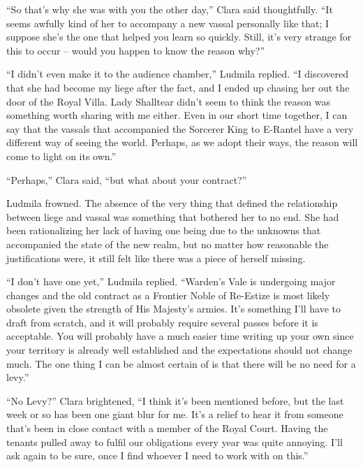  

“So that’s why she was with you the other day,” Clara said thoughtfully. “It seems awfully kind of her to accompany a new vassal personally like that; I suppose she’s the one that helped you learn so quickly. Still, it’s very strange for this to occur – would you happen to know the reason why?”

 

“I didn’t even make it to the audience chamber,” Ludmila replied. “I discovered that she had become my liege after the fact, and I ended up chasing her out the door of the Royal Villa. Lady Shalltear didn’t seem to think the reason was something worth sharing with me either. Even in our short time together, I can say that the vassals that accompanied the Sorcerer King to E-Rantel have a very different way of seeing the world. Perhaps, as we adopt their ways, the reason will come to light on its own.”

 

“Perhaps,” Clara said, “but what about your contract?”

 

Ludmila frowned. The absence of the very thing that defined the relationship between liege and vassal was something that bothered her to no end. She had been rationalizing her lack of having one being due to the unknowns that accompanied the state of the new realm, but no matter how reasonable the justifications were, it still felt like there was a piece of herself missing.

 

“I don’t have one yet,” Ludmila replied. “Warden’s Vale is undergoing major changes and the old contract as a Frontier Noble of Re-Estize is most likely obsolete given the strength of His Majesty’s armies. It’s something I’ll have to draft from scratch, and it will probably require several passes before it is acceptable. You will probably have a much easier time writing up your own since your territory is already well established and the expectations should not change much. The one thing I can be almost certain of is that there will be no need for a levy.”

 

“No Levy?” Clara brightened, “I think it’s been mentioned before, but the last week or so has been one giant blur for me. It’s a relief to hear it from someone that’s been in close contact with a member of the Royal Court. Having the tenants pulled away to fulfil our obligations every year was quite annoying. I’ll ask again to be sure, once I find whoever I need to work with on this.”

